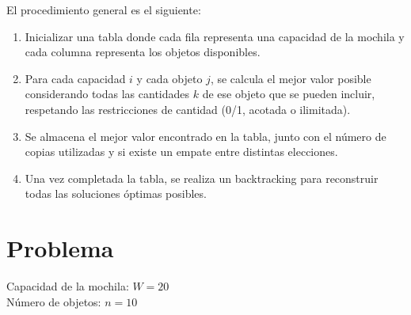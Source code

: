 \documentclass[12pt]{article}
\begin{document}
El procedimiento general es el siguiente:
\begin{enumerate}
  \item Inicializar una tabla donde cada fila representa una capacidad de la mochila y cada columna representa los objetos disponibles.
  \item Para cada capacidad $i$ y cada objeto $j$, se calcula el mejor valor posible considerando todas las cantidades $k$ de ese objeto que se pueden incluir, respetando las restricciones de cantidad (0/1, acotada o ilimitada).
  \item Se almacena el mejor valor encontrado en la tabla, junto con el número de copias utilizadas y si existe un empate entre distintas elecciones.
  \item Una vez completada la tabla, se realiza un backtracking para reconstruir todas las soluciones óptimas posibles.
\end{enumerate}

\bigskip
\section*{Problema}
Capacidad de la mochila: $W = 20$\\
Número de objetos: $n = 10$\\
\end{document}
